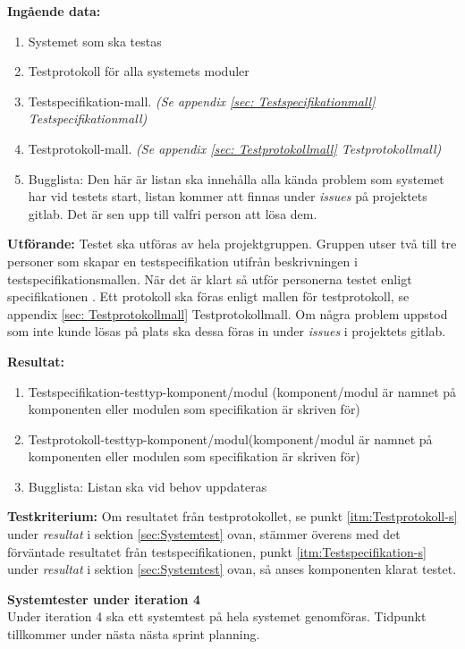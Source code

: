 \documentclass[a4paper,10pt, twoside]{article}
\begin{document}
\textbf{Ingående data:}
\begin{enumerate}
	\item Systemet som ska testas
    \item Testprotokoll för alla systemets moduler
    \item Testspecifikation-mall. \emph{(Se appendix \ref{sec: Testspecifikationmall} Testspecifikationmall)}
    \item Testprotokoll-mall. \emph{(Se appendix \ref{sec: Testprotokollmall} Testprotokollmall)}
    \item Bugglista: Den här är listan ska innehålla alla kända problem som systemet har vid testets start, listan kommer 			  att finnas under \emph{issues} på projektets gitlab. Det är sen upp till valfri person att lösa dem.
\end{enumerate}

\textbf{Utförande:} Testet ska utföras av hela projektgruppen. Gruppen utser två till tre personer som skapar en testspecifikation utifrån beskrivningen i
testspecifikationsmallen. När det är klart så utför personerna testet enligt specifikationen \cite{kravspec}. Ett protokoll ska föras enligt mallen för
testprotokoll, se appendix \ref{sec: Testprotokollmall} Testprotokollmall. Om några problem uppstod som inte kunde lösas på plats ska dessa föras in under \emph{issues} i projektets gitlab.

\textbf{Resultat:}
    \begin{enumerate}
        \item \label{itm:Testspecifikation-s} Testspecifikation-testtyp-komponent/modul (komponent/modul är namnet på 					  komponenten eller modulen som specifikation är skriven för)
        \item \label{itm:Testprotokoll-s} Testprotokoll-testtyp-komponent/modul(komponent/modul är namnet på komponenten 				  eller modulen som specifikation är skriven för)
        \item Bugglista: Listan ska vid behov uppdateras
    \end{enumerate}

\textbf{Testkriterium:} Om resultatet från testprotokollet, se punkt \ref{itm:Testprotokoll-s} under \emph{resultat} i sektion \ref{sec:Systemtest} ovan, stämmer överens med det förväntade resultatet från testspecifikationen, punkt \ref{itm:Testspecifikation-s} under \emph{resultat} i sektion \ref{sec:Systemtest} ovan, så anses komponenten klarat testet.

\textbf{Systemtester under iteration 4}
\\ Under iteration 4 ska ett systemtest på hela systemet genomföras. Tidpunkt tillkommer under nästa
   nästa sprint planning.
\end{document}
